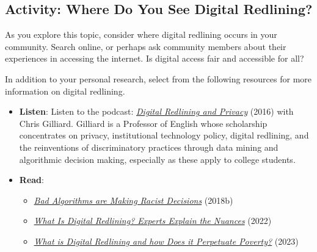 \documentclass[
  letterpaper,
  DIV=11,
  numbers=noendperiod]{scrreprt}
\providecommand{\tightlist}{%
  \setlength{\itemsep}{0pt}\setlength{\parskip}{0pt}}\usepackage{longtable,booktabs,array}
\begin{document}
\subsection{Activity: Where Do You See Digital
Redlining?}\label{activity-where-do-you-see-digital-redlining}

\begin{tcolorbox}[enhanced jigsaw, toprule=.15mm, colback=white, colframe=quarto-callout-note-color-frame, bottomtitle=1mm, leftrule=.75mm, coltitle=black, titlerule=0mm, rightrule=.15mm, colbacktitle=quarto-callout-note-color!10!white, left=2mm, title={Learning Activity}, opacitybacktitle=0.6, opacityback=0, breakable, toptitle=1mm, arc=.35mm, bottomrule=.15mm]

As you explore this topic, consider where digital redlining occurs in
your community. Search online, or perhaps ask community members about
their experiences in accessing the internet. Is digital access fair and
accessible for all?

In addition to your personal research, select from the following
resources for more information on digital redlining.

\begin{itemize}
\tightlist
\item
  \textbf{Listen}: Listen to the podcast:
  \href{https://teachinginhighered.com/podcast/digital-redlining-privacy/}{\emph{Digital
  Redlining and Privacy}} (2016) with Chris Gilliard. Gilliard is a
  Professor of English whose scholarship concentrates on privacy,
  institutional technology policy, digital redlining, and the
  reinventions of discriminatory practices through data mining and
  algorithmic decision making, especially as these apply to college
  students.
\item
  \textbf{Read}:

  \begin{itemize}
  \tightlist
  \item
    \href{https://www.cbc.ca/radio/spark/412-1.4887497/bad-algorithms-are-making-racist-decisions-1.4887504}{\emph{Bad
    Algorithms are Making Racist Decisions}} (2018b)
  \item
    \href{https://www.govtech.com/network/what-is-digital-redlining-experts-explain-the-nuances}{\emph{What
    Is Digital Redlining? Experts Explain the Nuances}} (2022)
  \item
    \href{https://communitytechnetwork.org/blog/digital-redlining-and-how-it-perputates-poverty/}{\emph{What
    is Digital Redlining and how Does it Perpetuate Poverty?}} (2023)
  \end{itemize}
\end{itemize}


\end{tcolorbox}
\end{document}
